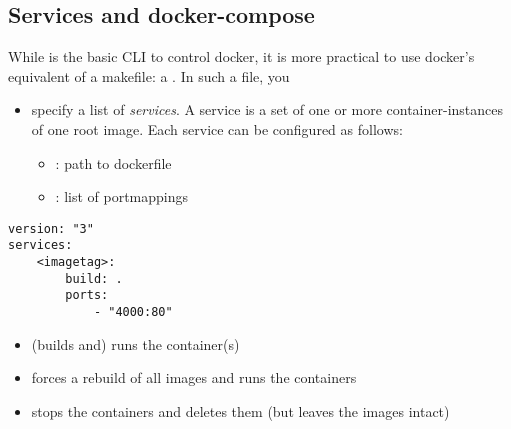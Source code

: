 \subsection{Services and docker-compose}
While  is the basic CLI to control docker, it is more practical to use docker's equivalent of a makefile: a . In such a file, you
\begin{itemize}
    \item specify a list of \emph{services}. A service is a set of one or more container-instances of one root image. Each service can be configured as follows:
    \begin{itemize}
        \item {}: path to dockerfile
        \item {}: list of portmappings
    \end{itemize}
\end{itemize}


\begin{lstlisting}
version: "3"
services: 
    <imagetag>: 
        build: .
        ports: 
            - "4000:80"
\end{lstlisting}

\begin{itemize}
    \item {} (builds and) runs the container(s)
    \item {} forces a rebuild of all images and runs the containers
    \item {} stops the containers and deletes them (but leaves the images intact)
\end{itemize}
